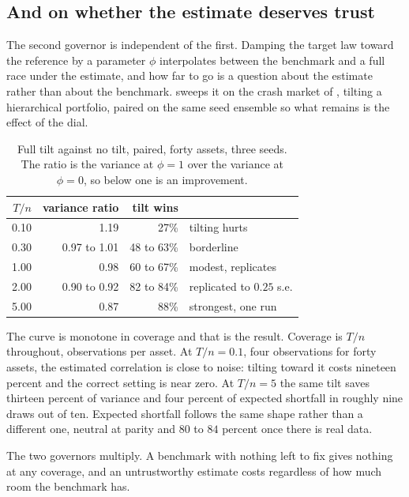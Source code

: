 \documentclass[11pt]{article}
\begin{document}
\subsection{And on whether the estimate deserves trust}
\label{sec:dial}

The second governor is independent of the first. Damping the target law toward
the reference by a parameter $\phi$ interpolates between the benchmark and a
full race under the estimate, and how far to go is a question about the
estimate rather than about the benchmark.  sweeps it on the
crash market of , tilting a hierarchical portfolio, paired on
the same seed ensemble so what remains is the effect of the dial.

\begin{table}[ht]
\centering
\begin{tabular}{rrrl}
\toprule
$T/n$ & variance ratio & tilt wins & \\
\midrule
0.10 & 1.19 & 27\% & tilting hurts \\
0.30 & 0.97 to 1.01 & 48 to 63\% & borderline \\
1.00 & 0.98 & 60 to 67\% & modest, replicates \\
2.00 & 0.90 to 0.92 & 82 to 84\% & replicated to $0.25$ s.e. \\
5.00 & 0.87 & 88\% & strongest, one run \\
\bottomrule
\end{tabular}
\caption{Full tilt against no tilt, paired, forty assets, three seeds. The
ratio is the variance at $\phi=1$ over the variance at $\phi=0$, so below one
is an improvement.}
\label{tab:dial}
\end{table}

The curve is monotone in coverage and that is the result. Coverage is $T/n$
throughout, observations per asset. At $T/n=0.1$, four observations for forty
assets, the estimated correlation is close to noise: tilting toward it costs
nineteen percent and the correct setting is near zero. At $T/n=5$ the same
tilt saves thirteen percent of variance and four percent of expected shortfall
in roughly nine draws out of ten. Expected shortfall follows the same shape
rather than a different one, neutral at parity and $80$ to $84$ percent once
there is real data.

The two governors multiply. A benchmark with nothing left to fix gives nothing
at any coverage, and an untrustworthy estimate costs regardless of how much
room the benchmark has.
\end{document}
